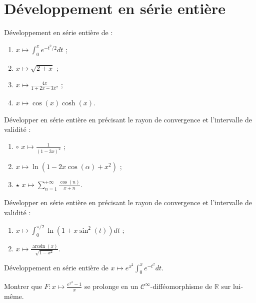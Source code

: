 \documentclass[french,a4paper]{article}
\newcommand{\R}{\mathbb{R}}
\theoremstyle{plain}
\theoremstyle{definition}
\theoremstyle{remark}
\begin{document}
\section{Développement en série entière}

\begin{ex}[Moulin.SE.34]{}
	Développement en série entière de :
	\begin{enumerate}
		\item $x\mapsto\displaystyle\int_{0}^{x}e^{-t^2/2}dt$ ;
		\item $x\mapsto\sqrt{2+x}$ ;
		\item $x\mapsto\displaystyle\frac{4x}{1+2x-3x^2}$ ;
		\item $x\mapsto\cos(x)\cosh(x)$.
	\end{enumerate}
\end{ex}

\begin{ex}[Moulin.SE.35]{}
	Développer en série entière en précisant le rayon de convergence et l'intervalle de validité :
	\begin{enumerate}
		\item $\circ$ $x\mapsto\displaystyle\frac{1}{(1-3x)^2}$ ;
		\item $x\mapsto\ln(1-2x\cos(\alpha)+x^2)$ ;
		\item $\star$ $x\mapsto\displaystyle\sum_{n=1}^{+\infty}\frac{\cos(n)}{x+n}$.
	\end{enumerate}
\end{ex}

\begin{ex}[Moulin.SE.36]{}
	Développer en série entière en précisant le rayon de convergence et l'intervalle de validité :
	\begin{enumerate}
		\item $x\mapsto\displaystyle\int_{0}^{\pi/2}\ln(1+x\sin^2(t))dt$ ;
		\item $x\mapsto\displaystyle\frac{\arcsin(x)}{\sqrt{1-x^2}}$.
	\end{enumerate}
\end{ex}

\begin{ex}[Moulin.SE.37]{}
	Développement en série entière de $x\mapsto\displaystyle e^{x^2}\int_{0}^{x}e^{-t^2}dt$.
\end{ex}

\begin{ex}[Moulin.SE.38]{}
	Montrer que $F:x\mapsto\displaystyle\frac{e^{x^2}-1}{x}$ se prolonge en un $\mathcal{C}^\infty$-difféomorphisme de $\R$ sur lui-même.
\end{ex}
\end{document}
